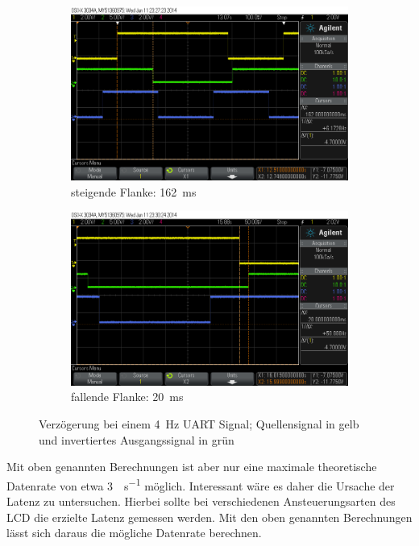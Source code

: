 \documentclass[12pt,a4paper]{article}
\begin{document}
\begin{figure}[H]
  \centering
  \begin{subfigure}[b]{0.6\textwidth}
    \includegraphics[width=\textwidth]{../measurements/20140611/4Hz_rising_edge/scope_2.png}
    \caption{steigende Flanke: \SI{162}{\milli\second}}
    \label{fig:uart_4hz_rising_edge}
  \end{subfigure}
  \begin{subfigure}[b]{0.6\textwidth}
    \includegraphics[width=\textwidth]{../measurements/20140611/4Hz_falling_edge/scope_6.png}
    \caption{fallende Flanke: \SI{20}{\milli\second}}
    \label{fig:uart_4hz_falling_edge}
  \end{subfigure}
  \caption{Verzögerung bei einem \SI{4}{\hertz} UART Signal; Quellensignal in gelb und invertiertes Ausgangssignal in grün}
  \label{fig:uart_4hz_edge}
\end{figure}

Mit oben genannten Berechnungen ist aber nur eine maximale theoretische Datenrate von etwa \SI{3}{\bit\per\second} möglich. Interessant wäre es daher die Ursache der Latenz zu untersuchen. Hierbei sollte bei verschiedenen Ansteuerungsarten des LCD die erzielte Latenz gemessen werden. Mit den oben genannten Berechnungen lässt sich daraus die mögliche Datenrate berechnen.
\end{document}
